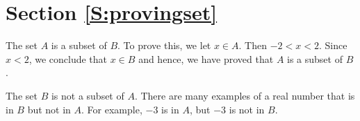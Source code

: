\section*{Section \ref{S:provingset}}
\renewcommand{\labelenumi}{(\textbf{\alph{enumi}})}

%
%

\begin{list}{\bf{\ref{exer:sec42-2}.}}
\item \begin{list}{\bf{(a)}}
\item The set  $A$  is  a subset of  $B$.  To prove this, we let  $x \in A$.  Then  
$ - 2 < x < 2$.  Since  $x < 2$, we conclude that  $x \in B$ and hence, we have proved that $A$ is a subset of $B$.
\end{list}
\end{list}

\begin{list}{}
\item \begin{list}{\bf{(b)}}
\item The set  $B$  is not a subset of  $A$.  There are many examples of a real number that is in  $B$  but not in  $A$.  For example, $-3$ is in $A$, but $-3$ is not in $B$.
\end{list}
\end{list}



